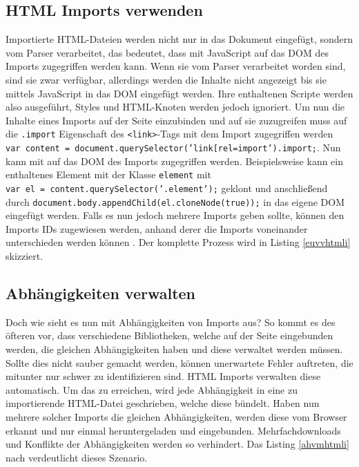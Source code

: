 


\subsection{\ac{HTML} Imports verwenden}\label{html-imports-verwenden}

Importierte \ac{HTML}-Dateien werden nicht nur in das Dokument eingefügt, sondern vom Parser verarbeitet, das bedeutet, dass mit JavaScript auf das \ac{DOM} des Imports zugegriffen werden kann. Wenn sie vom Parser verarbeitet worden sind, sind sie zwar verfügbar, allerdings werden die Inhalte nicht angezeigt bis sie mittels JavaScript in das \ac{DOM} eingefügt werden. Ihre enthaltenen Scripte werden also ausgeführt, Styles und \ac{HTML}-Knoten werden jedoch ignoriert. Um nun die Inhalte eines Imports auf der Seite einzubinden und auf sie zuzugreifen muss auf die \texttt{.import} Eigenschaft des \texttt{\textless{}link\textgreater{}}-Tags mit dem Import zugegriffen werden \texttt{var\ content\ =\ document.querySelector('link{[}rel=\dq import\dq{]}').import;}. Nun kann mit auf das \ac{DOM} des Imports zugegriffen werden. Beispielsweise kann ein enthaltenes Element mit der Klasse \texttt{element} mit \texttt{var\ el\ =\ content.querySelector('.element');} geklont und anschließend durch \texttt{document.body.appendChild(el.cloneNode(true));} in das eigene \ac{DOM} eingefügt werden. Falls es nun jedoch mehrere Imports geben sollte, können den Imports IDs zugewiesen werden, anhand derer die Imports voneinander unterschieden werden können \cite{citeulike:13853724}. Der komplette Prozess wird in Listing \ref{euvvhtmli} skizziert.




\subsection{Abhängigkeiten verwalten}\label{abhuxe4ngigkeiten-verwalten}

Doch wie sieht es nun mit Abhängigkeiten von Imports aus? So kommt es des öfteren vor, dass verschiedene Bibliotheken, welche auf der Seite eingebunden werden, die gleichen Abhängigkeiten haben und diese verwaltet werden müssen. Sollte dies nicht sauber gemacht werden, können unerwartete Fehler auftreten, die mitunter nur schwer zu identifizieren sind. \ac{HTML} Imports verwalten diese automatisch. Um das zu erreichen, wird jede Abhängigkeit in eine zu importierende \ac{HTML}-Datei geschrieben, welche diese bündelt. Haben nun mehrere solcher Imports die gleichen Abhängigkeiten, werden diese vom Browser erkannt und nur einmal heruntergeladen und eingebunden. Mehrfachdownloads und Konflikte der Abhängigkeiten werden so verhindert. Das Listing \ref{ahvmhtmli} nach \cite{citeulike:13853700} verdeutlicht dieses Szenario.

